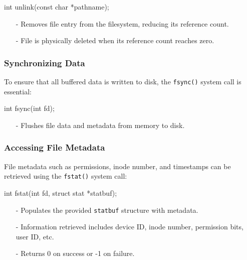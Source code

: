 \documentclass[../../compsys.tex]{subfiles}
\begin{document}
\begin{cc}
int unlink(const char *pathname);
\end{cc}
\begin{itemize}[itemsep=2pt, topsep=1pt]
  \item[-] Removes file entry from the filesystem, reducing its reference count.
  \item[-] File is physically deleted when its reference count reaches zero.
\end{itemize}

\subsubsection{Synchronizing Data}

To ensure that all buffered data is written to disk, the \texttt{fsync()} system call is essential:

\begin{cc}
int fsync(int fd);
\end{cc}
\begin{itemize}[itemsep=2pt, topsep=1pt]
  \item[-] Flushes file data and metadata from memory to disk.
\end{itemize}

\subsubsection{Accessing File Metadata}
File metadata such as permissions, inode number, and timestamps can be retrieved using the \texttt{fstat()} system call:

\begin{cc}
int fstat(int fd, struct stat *statbuf);
\end{cc}
\begin{itemize}[itemsep=2pt, topsep=1pt]
  \item[-] Populates the provided \texttt{statbuf} structure with metadata.
  \item[-] Information retrieved includes device ID, inode number, permission bits, user ID, etc.
  \item[-] Returns 0 on success or -1 on failure.
\end{itemize}
\end{document}
